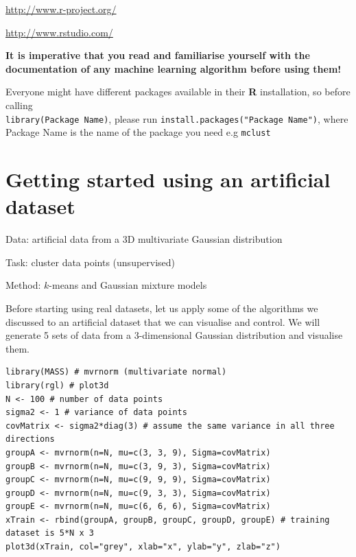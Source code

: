 \documentclass[a4paper,11pt]{article}
\begin{document}
\begin{description}[leftmargin=11em,style=nextline]
	\item[Installing \textbf{R}:] \url{http://www.r-project.org/} 
	\item[Installing RStudio:] \url{http://www.rstudio.com/}
\end{description}  

\begin{framed}
\textbf{It is imperative that you read and familiarise yourself with the documentation of 
any machine learning algorithm before using them!} 
\end{framed}

Everyone might have different packages available in their \textbf{R} installation, so
before calling\\ 
{\lstinline[style=RCode, basicstyle=\normalsize\ttfamily] |library(Package Name)|}, please run
{\lstinline[style=RCode, basicstyle=\normalsize\ttfamily] |install.packages("Package Name")|}, where
Package Name is the name of the package you need e.g {\lstinline[style=RCode, basicstyle=\normalsize\ttfamily] |mclust|}

\clearpage
\section{Getting started using an artificial dataset}
\begin{framed}
\begin{description}[leftmargin=5em,style=nextline]\addtolength{\itemsep}{-0.2\baselineskip}
	\item[Data:] artificial data from a 3D multivariate Gaussian distribution
	\item[Task:] cluster data points (unsupervised)
	\item[Method:] $k$-means and Gaussian mixture models
\end{description} 
\end{framed}

Before starting using real datasets, let us apply some of the algorithms we discussed
to an artificial dataset that we can visualise and control. We will generate 5 sets of data
from a 3-dimensional Gaussian distribution and visualise them.
\\
\begin{lstlisting}[style=RCode]
library(MASS) # mvrnorm (multivariate normal)
library(rgl) # plot3d
N <- 100 # number of data points
sigma2 <- 1 # variance of data points
covMatrix <- sigma2*diag(3) # assume the same variance in all three directions
groupA <- mvrnorm(n=N, mu=c(3, 3, 9), Sigma=covMatrix)
groupB <- mvrnorm(n=N, mu=c(3, 9, 3), Sigma=covMatrix)
groupC <- mvrnorm(n=N, mu=c(9, 9, 9), Sigma=covMatrix)
groupD <- mvrnorm(n=N, mu=c(9, 3, 3), Sigma=covMatrix)
groupE <- mvrnorm(n=N, mu=c(6, 6, 6), Sigma=covMatrix)
xTrain <- rbind(groupA, groupB, groupC, groupD, groupE) # training dataset is 5*N x 3
plot3d(xTrain, col="grey", xlab="x", ylab="y", zlab="z")
\end{lstlisting}
\end{document}
